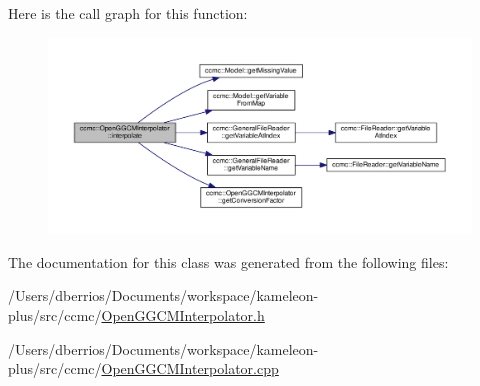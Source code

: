 Here is the call graph for this function\-:
\nopagebreak
\begin{figure}[H]
\begin{center}
\leavevmode
\includegraphics[width=350pt]{classccmc_1_1_open_g_g_c_m_interpolator_ad7edc3f7862deda978513f923fc30c33_cgraph}
\end{center}
\end{figure}




The documentation for this class was generated from the following files\-:\begin{DoxyCompactItemize}
\item 
/\-Users/dberrios/\-Documents/workspace/kameleon-\/plus/src/ccmc/\hyperlink{_open_g_g_c_m_interpolator_8h}{Open\-G\-G\-C\-M\-Interpolator.\-h}\item 
/\-Users/dberrios/\-Documents/workspace/kameleon-\/plus/src/ccmc/\hyperlink{_open_g_g_c_m_interpolator_8cpp}{Open\-G\-G\-C\-M\-Interpolator.\-cpp}\end{DoxyCompactItemize}
